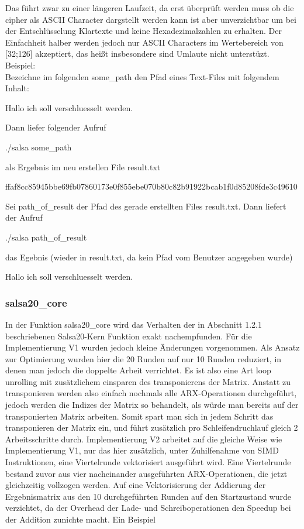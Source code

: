 \documentclass[course=erap]{aspdoc}
\begin{document}
Das führt zwar zu einer längeren Laufzeit, da erst überprüft werden muss ob die cipher als ASCII Character dargstellt werden kann ist aber unverzichtbar um bei der Entschlüsselung Klartexte und keine Hexadezimalzahlen zu erhalten.
Der Einfachheit halber werden jedoch nur ASCII Characters im Wertebereich von [32;126] akzeptiert, das heißt insbesondere sind Umlaute nicht unterstüzt.
\\Beispiel: 
\\Bezeichne im folgenden some\_path den Pfad eines Text-Files mit folgendem Inhalt:
\begin{center}
    Hallo ich soll verschluesselt werden.
\end{center}
Dann liefer folgender Aufruf
\begin{center}
    ./salsa some\_path
\end{center}
als Ergebnis im neu erstellen File result.txt
\begin{center}
    ffaf8cc85945bbe69fb07860173e0f855ebe070b80c82b91922bcab1f0d85208fde3c49610
\end{center}
Sei path\_of\_result der Pfad des gerade erstellten Files result.txt. Dann liefert der Aufruf
\begin{center}
   ./salsa path\_of\_result
\end{center}
das Egebnis (wieder in result.txt, da kein Pfad vom Benutzer angegeben wurde)
\begin{center}
    Hallo ich soll verschluesselt werden.
\end{center}

\subsubsection{salsa20\_core}
In der Funktion salsa20\_core wird das Verhalten der in Abschnitt 1.2.1 beschriebenen Salsa20-Kern Funktion exakt nachempfunden. Für die Implementierung V1 wurden jedoch kleine Änderungen vorgenommen.
Als Ansatz zur Optimierung wurden hier die 20 Runden auf nur 10 Runden reduziert, in denen man jedoch die doppelte Arbeit verrichtet. Es ist also eine Art loop unrolling mit zusätzlichem einsparen des 
transponierens der Matrix. Anstatt zu transponieren werden also einfach nochmals alle ARX-Operationen durchgeführt, jedoch werden die Indizes der Matrix so behandelt, als würde man bereits auf
der transponierten Matrix arbeiten. Somit spart man sich in jedem Schritt das transponieren der Matrix ein, und führt zusätzlich pro Schleifendruchlauf gleich 2 Arbeitsschritte durch. Implementierung V2
arbeitet auf die gleiche Weise wie Implementierung V1, nur das hier zusätzlich, unter Zuhilfenahme von SIMD Instruktionen, eine Viertelrunde vektorisiert ausgeführt wird. Eine Viertelrunde bestand zuvor 
aus vier nacheinander ausgeführten ARX-Operationen, die jetzt gleichzeitig vollzogen werden. Auf eine Vektorisierung der Addierung der Ergebnismatrix aus den 10 durchgeführten Runden auf den Startzustand wurde verzichtet,
da der Overhead der Lade- und Schreiboperationen den Speedup bei der Addition zunichte macht.
Ein Beispiel
\end{document}
